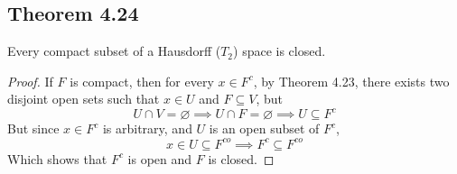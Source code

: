 \documentclass[../../main.tex]{subfiles}
\begin{document}
\subsection{Theorem 4.24}
\begin{wts}
Every compact subset of a Hausdorff ($T_2$) space is closed.
\end{wts}
\begin{proof}
If $F$ is compact, then for every $x\in F^c$, by Theorem 4.23, there exists two disjoint open sets such that $x\in U$ and $F\subseteq V$, but 
\[
U\cap V = \varnothing\implies U\cap F=\varnothing\implies U\subseteq F^c
\]
But since $x\in F^c$ is arbitrary, and $U$ is an open subset of $F^c$, 
\[
x\in U\subseteq F^{co}\implies F^c\subseteq F^{co}
\]
Which shows that $F^c$ is open and $F$ is closed.
\end{proof}
\end{document}
